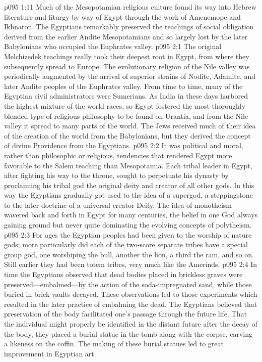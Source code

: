 \vs p095 1:11 Much of the Mesopotamian religious culture found its way into Hebrew literature and liturgy by way of Egypt through the work of Amenemope and Ikhnaton. The Egyptians remarkably preserved the teachings of social obligation derived from the earlier Andite Mesopotamians and so largely lost by the later Babylonians who occupied the Euphrates valley.
\vs p095 2:1 The original Melchizedek teachings really took their deepest root in Egypt, from where they subsequently spread to Europe. The evolutionary religion of the Nile valley was periodically augmented by the arrival of superior strains of Nodite, Adamite, and later Andite peoples of the Euphrates valley. From time to time, many of the Egyptian civil administrators were Sumerians. As India in these days harbored the highest mixture of the world races, so Egypt fostered the most thoroughly blended type of religious philosophy to be found on Urantia, and from the Nile valley it spread to many parts of the world. The Jews received much of their idea of the creation of the world from the Babylonians, but they derived the concept of divine Providence from the Egyptians.
\vs p095 2:2 It was political and moral, rather than philosophic or religious, tendencies that rendered Egypt more favorable to the Salem teaching than Mesopotamia. Each tribal leader in Egypt, after fighting his way to the throne, sought to perpetuate his dynasty by proclaiming his tribal god the original deity and creator of all other gods. In this way the Egyptians gradually got used to the idea of a supergod, a steppingstone to the later doctrine of a universal creator Deity. The idea of monotheism wavered back and forth in Egypt for many centuries, the belief in one God always gaining ground but never quite dominating the evolving concepts of polytheism.
\vs p095 2:3 For ages the Egyptian peoples had been given to the worship of nature gods; more particularly did each of the two\hyp{}score separate tribes have a special group god, one worshiping the bull, another the lion, a third the ram, and so on. Still earlier they had been totem tribes, very much like the Amerinds.
\pc \vs p095 2:4 In time the Egyptians observed that dead bodies placed in brickless graves were preserved---embalmed---by the action of the soda\hyp{}impregnated sand, while those buried in brick vaults decayed. These observations led to those experiments which resulted in the later practice of embalming the dead. The Egyptians believed that preservation of the body facilitated one’s passage through the future life. That the individual might properly be identified in the distant future after the decay of the body, they placed a burial statue in the tomb along with the corpse, carving a likeness on the coffin. The making of these burial statues led to great improvement in Egyptian art.

